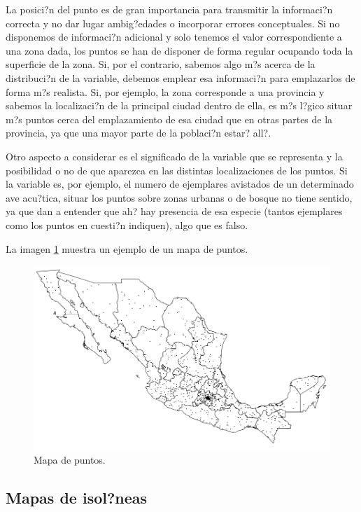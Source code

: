 La posici?n del punto es de gran importancia para transmitir la informaci?n correcta y no dar lugar ambig?edades o incorporar errores conceptuales. Si no disponemos de informaci?n adicional y solo tenemos el valor correspondiente a una zona dada, los puntos se han de disponer de forma regular ocupando toda la superficie de la zona. Si, por el contrario, sabemos algo m?s acerca de la distribuci?n de la variable, debemos emplear esa informaci?n para emplazarlos de forma m?s realista. Si, por ejemplo, la zona corresponde a una provincia y sabemos la localizaci?n de la principal ciudad dentro de ella, es m?s l?gico situar m?s puntos cerca del emplazamiento de esa ciudad que en otras partes de la provincia, ya que una mayor parte de la poblaci?n estar? all?.

Otro aspecto a considerar es el significado de la variable que se representa y la posibilidad o no de que aparezca en las distintas localizaciones de los puntos. Si la variable es, por ejemplo, el numero de ejemplares avistados de un determinado ave acu?tica, situar los puntos sobre zonas urbanas o de bosque no tiene sentido, ya que dan a entender que ah? hay presencia de esa especie (tantos ejemplares como los puntos en cuesti?n indiquen), algo que es falso.


La imagen \ref{Fig:MapaPuntos} muestra un ejemplo de un mapa de puntos.


\begin{figure}[!hbt]
\centering
\includegraphics[width=.8\columnwidth]{../es/Visualizacion/MapaPuntos.png}
\caption{\small Mapa de puntos.}
\label{Fig:MapaPuntos} 
\end{figure}


\subsection{Mapas de isol?neas}

